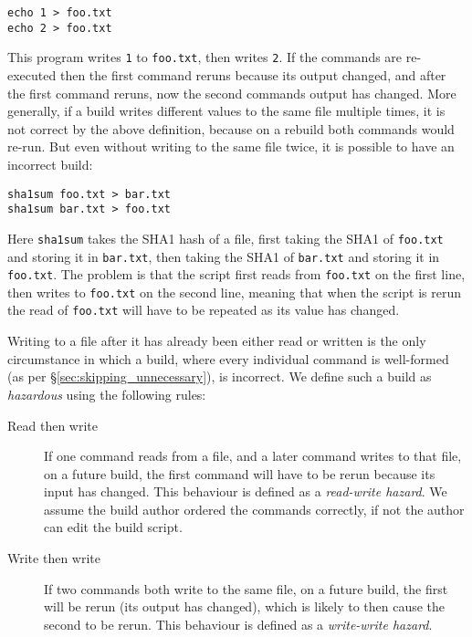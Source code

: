 \vspace{1mm}
\begin{small}
\begin{verbatim}
echo 1 > foo.txt
echo 2 > foo.txt
\end{verbatim}
\end{small}
\vspace{1mm}

\noindent
This program writes \texttt{1} to \texttt{foo.txt}, then writes \texttt{2}. If the commands are re-executed then the first command reruns because its output changed, and after the first command reruns, now the second commands output has changed. More generally, if a build writes different values to the same file multiple times, it is not correct by the above definition, because on a rebuild both commands would re-run. But even without writing to the same file twice, it is possible to have an incorrect build:

\vspace{1mm}
\begin{small}
\begin{verbatim}
sha1sum foo.txt > bar.txt
sha1sum bar.txt > foo.txt
\end{verbatim}
\end{small}
\vspace{1mm}

\noindent
Here \texttt{sha1sum} takes the SHA1 hash of a file, first taking the SHA1 of \texttt{foo.txt} and storing it in \texttt{bar.txt}, then taking the SHA1 of \texttt{bar.txt} and storing it in \texttt{foo.txt}. The problem is that the script first reads from \texttt{foo.txt} on the first line, then writes to \texttt{foo.txt} on the second line, meaning that when the script is rerun the read of \texttt{foo.txt} will have to be repeated as its value has changed.

Writing to a file after it has already been either read or written is the only circumstance in which a build, where every individual command is well-formed (as per \S\ref{sec:skipping_unnecessary}), is incorrect. We define such a build as \emph{hazardous} using the following rules:

\begin{description}
\item[Read then write] If one command reads from a file, and a later command writes to that file, on a future build, the first command will have to be rerun because its input has changed. This behaviour is defined as a \emph{read-write hazard}.  We assume the build author ordered the commands correctly, if not the author can edit the build script.
\item[Write then write] If two commands both write to the same file, on a future build, the first will be rerun (its output has changed), which is likely to then cause the second to be rerun. This behaviour is defined as a \emph{write-write hazard}.
\end{description}

